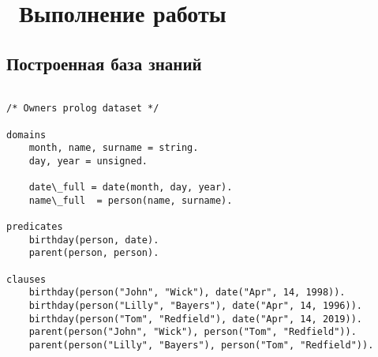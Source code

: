 \chapter{ Выполнение работы}
\label{cha:analysis}

\section{ Построенная база знаний}

\begin{lstlisting}[style=lispStyle, caption={Получение элементов списка с помощью команд car и cdr.},
                    label={lst:thirdtask}]

/* Owners prolog dataset */

domains
    month, name, surname = string.
    day, year = unsigned.

    date\_full = date(month, day, year).
    name\_full  = person(name, surname).

predicates
    birthday(person, date).
    parent(person, person).

clauses
    birthday(person("John", "Wick"), date("Apr", 14, 1998)).
    birthday(person("Lilly", "Bayers"), date("Apr", 14, 1996)).
    birthday(person("Tom", "Redfield"), date("Apr", 14, 2019)).
    parent(person("John", "Wick"), person("Tom", "Redfield")).
    parent(person("Lilly", "Bayers"), person("Tom", "Redfield")).

\end{lstlisting}
